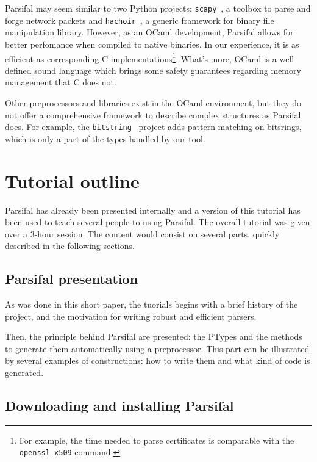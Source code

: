 \documentclass{article}
\begin{document}
Parsifal may seem similar to two Python projects:
\texttt{scapy}~\cite{scapy}, a toolbox to parse and forge network
packets and \texttt{hachoir}~\cite{hachoir}, a generic framework for
binary file manipulation library. However, as an OCaml development,
Parsifal allows for better perfomance when compiled to native
binaries. In our experience, it is as efficient as corresponding C
implementations\footnote{For example, the time needed to parse
  certificates is comparable with the \texttt{openssl x509}
  command.}. What's more, OCaml is a well-defined sound language which
brings some safety guarantees regarding memory management that C does
not.

Other preprocessors and libraries exist in the OCaml environment, but
they do not offer a comprehensive framework to describe complex
structures as Parsifal does. For example, the
\texttt{bitstring}~\cite{bitstring} project adds pattern matching on
bitsrings, which is only a part of the types handled by our tool.



\section{Tutorial outline}

Parsifal has already been presented internally and a version of this
tutorial has been used to teach several people to using Parsifal. The
overall tutorial was given over a 3-hour session. The content would
consist on several parts, quickly described in the following sections.



\subsection{Parsifal presentation}

As was done in this short paper, the tuorials begins with a brief
history of the project, and the motivation for writing robust and
efficient parsers.

Then, the principle behind Parsifal are presented: the PTypes and the
methods to generate them automatically using a preprocessor. This part
can be illustrated by several examples of constructions: how to write
them and what kind of code is generated.


\subsection{Downloading and installing Parsifal}
\end{document}
